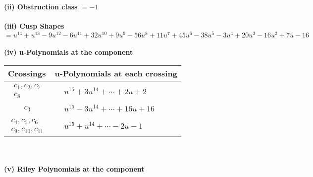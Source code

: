 \documentclass[1p]{elsarticle_modified}
\theoremstyle{definition}
\begin{document}
\flushleft \textbf{(ii) Obstruction class $= -1$}\\~\\
\flushleft \textbf{(iii) Cusp Shapes $= u^{14}+u^{13}-9 u^{12}-6 u^{11}+32 u^{10}+9 u^9-56 u^8+11 u^7+45 u^6-38 u^5-3 u^4+20 u^3-16 u^2+7 u-16$}\\~\\
\newpage\renewcommand{\arraystretch}{1}
\flushleft \textbf{(iv) u-Polynomials at the component}\newline \\
\begin{tabular}{m{50pt}|m{274pt}}
Crossings & \hspace{64pt}u-Polynomials at each crossing \\
\hline $$\begin{aligned}c_{1},c_{2},c_{7}\\c_{8}\end{aligned}$$&$\begin{aligned}
&u^{15}+3 u^{14}+\cdots+2 u+2
\end{aligned}$\\
\hline $$\begin{aligned}c_{3}\end{aligned}$$&$\begin{aligned}
&u^{15}-3 u^{14}+\cdots+16 u+16
\end{aligned}$\\
\hline $$\begin{aligned}c_{4},c_{5},c_{6}\\c_{9},c_{10},c_{11}\end{aligned}$$&$\begin{aligned}
&u^{15}+u^{14}+\cdots-2 u-1
\end{aligned}$\\
\hline
\end{tabular}\\~\\
\newpage\renewcommand{\arraystretch}{1}
\flushleft \textbf{(v) Riley Polynomials at the component}\newline \\
\end{document}
